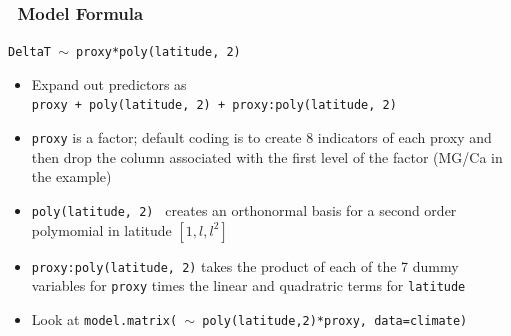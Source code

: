 \documentclass[handout]{beamer}
\begin{document}
\begin{frame}
  \frametitle{ \R\ Model Formula}
\centerline{{\tt DeltaT $\sim$ proxy*poly(latitude, 2) }}  
\pause
\begin{itemize}
\item Expand out predictors as\\ 
\small{{\tt proxy + poly(latitude, 2) + proxy:poly(latitude,
  2)}} \pause
\item {\tt proxy}  is a factor; default coding is to create 8  indicators
  of each proxy and then drop the column  associated with the first
  level of the factor  (MG/Ca in the example) \pause
\item {\tt poly(latitude, 2) } creates an orthonormal basis for a
  second order polymomial in latitude $[1, l, l^2]$ \pause
\item {\tt proxy:poly(latitude,  2)} takes the product of each of the 7 dummy
  variables for {\tt proxy} times the linear and quadratric terms for {\tt latitude} 
\item Look at {\tt model.matrix( $\sim$ poly(latitude,2)*proxy, data=climate)}
\end{itemize}
\end{frame}
\end{document}
